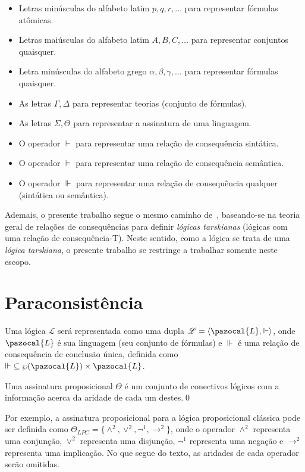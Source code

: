 \begin{itemize}
    \item Letras minúsculas do alfabeto latim $p, q, r, \ldots$ para representar fórmulas atômicas.
    \item Letras maiúsculas do alfabeto latim $A, B, C, \ldots$ para representar conjuntos quaisquer.
    \item Letra minúsculas do alfabeto grego $\alpha, \beta, \gamma, \ldots$ para representar fórmulas quaisquer.
    \item As letras $\Gamma, \Delta$ para representar teorias (conjunto de fórmulas).
    \item As letras $\Sigma, \Theta$ para representar a assinatura de uma linguagem.
    \item O operador $\vdash$ para representar uma relação de consequência sintática.
    \item O operador $\vDash$ para representar uma relação de consequência semântica.
    \item O operador $\Vdash$ para representar uma relação de consequência qualquer (sintática ou semântica).
\end{itemize}

Ademais, o presente trabalho segue o mesmo caminho de~, baseando-se na teoria geral de relações de consequências para definir \textit{lógicas tarskianas} (lógicas com uma relação de consequência-T). Neste sentido, como a lógica \lfium{} se trata de uma \textit{lógica tarskiana}, o presente trabalho se restringe a trabalhar somente neste escopo.

\section{Paraconsistência}
\label{sec:paracons}

Uma lógica $\mathcal{L}$ será representada como uma dupla $\mathcal{L} = \langle \pazocal{L},\Vdash \rangle$, onde $\pazocal{L}$ é sua linguagem (seu conjunto de fórmulas) e $\Vdash$ é uma relação de consequência de conclusão única, definida como $\Vdash \;\subseteq \wp(\pazocal{L})\times\pazocal{L}$.

\begin{definicao}
    \label{def:ass_prop}
    Uma assinatura proposicional $\Theta$ é um conjunto de conectivos lógicos com a informação acerca da aridade de cada um destes.\qed{}
\end{definicao}
Por exemplo, a assinatura proposicional para a lógica proposicional clássica pode ser definida como $\Theta_{LPC} = \{\land^{2}, \lor^{2}, \neg^{1}, \rightarrow^{2}\}$, onde o operador $\land^{2}$ representa uma conjunção, $\lor^{2}$ representa uma disjunção, $\neg^{1}$ representa uma negação e $\rightarrow^{2}$ representa uma implicação. No que segue do texto, as aridades de cada operador serão omitidas.

